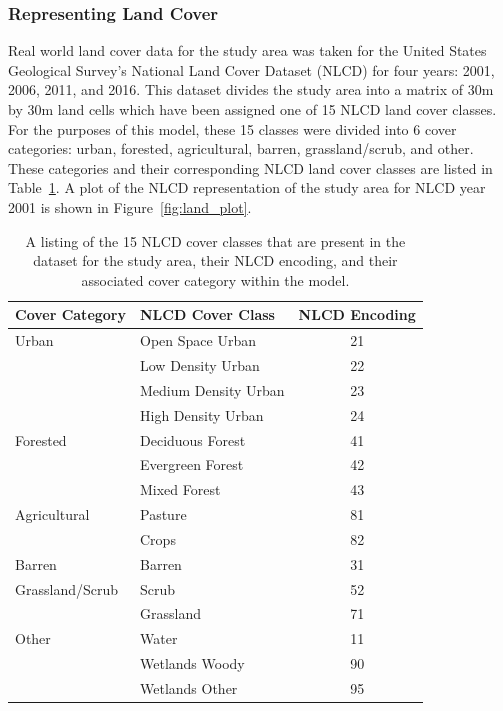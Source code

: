 \subsubsection{Representing Land Cover}

Real world land cover data for the study area was taken
for the United States Geological Survey's National Land Cover Dataset (NLCD)
for four years: 2001, 2006, 2011, and 2016.
This dataset divides the study area into a matrix of 30m by 30m
land cells which have been assigned one of 15 NLCD land cover classes.
For the purposes of this model, these 15 classes were divided into
6 cover categories: urban, forested, agricultural, barren, grassland/scrub,
and other.
These categories and their corresponding NLCD land cover classes
are listed in Table~\ref{tab:nlcd}.
A plot of the NLCD representation of the study area for NLCD year 2001
is shown in Figure~\ref{fig:land_plot}.

\begin{table}
\centering
\caption{A listing of the 15 NLCD cover classes that are present in
the dataset for the study area, their NLCD encoding,
and their associated cover category within the model.}
\label{tab:nlcd}
\begin{tabular}{llc}
\hline
\hline
    Cover Category & NLCD Cover Class & NLCD Encoding \\
\hline
    Urban & Open Space Urban & 21 \\
    & Low Density Urban & 22 \\
    & Medium Density Urban & 23 \\
    & High Density Urban & 24 \\
    Forested & Deciduous Forest & 41 \\
    & Evergreen Forest & 42 \\
    & Mixed Forest & 43 \\
    Agricultural 
    & Pasture & 81 \\
    & Crops & 82\\
    Barren & Barren & 31 \\
    Grassland/Scrub & Scrub & 52 \\
    & Grassland & 71 \\
    Other & Water & 11 \\
    & Wetlands Woody & 90 \\
    & Wetlands Other & 95 \\
\hline
\end{tabular}
\end{table}

